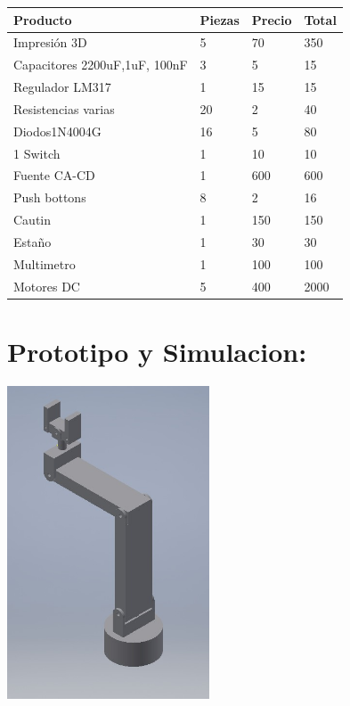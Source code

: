 \documentclass[14pt,a4paper]{article}
\begin{document}
\begin{tabular}{|l|l|l|l|}
\hline
	Producto & Piezas & Precio & Total\\
\hline
	Impresión 3D & 5 & 70$  $ & 350\\

\hline
	Capacitores 2200uF,1uF, 100nF & 3 & 5$  $ & 15\\
\hline
	Regulador LM317 & 1 & 15$  $ & 15\\
\hline
	Resistencias varias & 20 & 2$  $ & 40\\
\hline
	Diodos1N4004G & 16 & 5$  $ & 80\\
\hline
	1 Switch & 1 & 10$  $ & 10\\

\hline
	Fuente CA-CD & 1 & 600$  $ & 600\\
\hline
	Push bottons & 8 & 2$  $ & 16\\
\hline
    Cautin & 1 & 150$  $ & 150\\
\hline
	Estaño & 1 & 30$  $ & 30\\
\hline
	Multimetro & 1 & 100$  $ & 100\\
\hline
    Motores DC & 5 & 400$  $ & 2000\\
\hline
\end{tabular}

\section{Prototipo y Simulacion:}
\begin{center}
\includegraphics[width=6cm]{Proto.jpeg}
\end{center}
\end{document}
